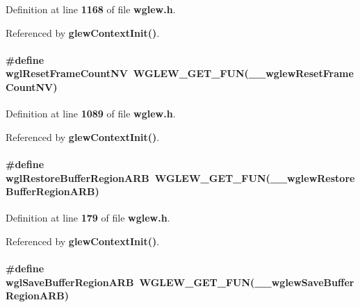 Definition at line {\bf 1168} of file {\bf wglew.\+h}.



Referenced by {\bf glew\+Context\+Init()}.

\paragraph[{wgl\+Reset\+Frame\+Count\+NV}]{\setlength{\rightskip}{0pt plus 5cm}\#define wgl\+Reset\+Frame\+Count\+NV~{\bf W\+G\+L\+E\+W\+\_\+\+G\+E\+T\+\_\+\+F\+UN}({\bf \+\_\+\+\_\+wglew\+Reset\+Frame\+Count\+NV})}\label{wglew_8h_a6d4b87a102ce9b21cc4f91b30b2d119e}


Definition at line {\bf 1089} of file {\bf wglew.\+h}.



Referenced by {\bf glew\+Context\+Init()}.

\paragraph[{wgl\+Restore\+Buffer\+Region\+A\+RB}]{\setlength{\rightskip}{0pt plus 5cm}\#define wgl\+Restore\+Buffer\+Region\+A\+RB~{\bf W\+G\+L\+E\+W\+\_\+\+G\+E\+T\+\_\+\+F\+UN}({\bf \+\_\+\+\_\+wglew\+Restore\+Buffer\+Region\+A\+RB})}\label{wglew_8h_a9f4fdb93cd779a0f8ea1f85426a91636}


Definition at line {\bf 179} of file {\bf wglew.\+h}.



Referenced by {\bf glew\+Context\+Init()}.

\paragraph[{wgl\+Save\+Buffer\+Region\+A\+RB}]{\setlength{\rightskip}{0pt plus 5cm}\#define wgl\+Save\+Buffer\+Region\+A\+RB~{\bf W\+G\+L\+E\+W\+\_\+\+G\+E\+T\+\_\+\+F\+UN}({\bf \+\_\+\+\_\+wglew\+Save\+Buffer\+Region\+A\+RB})}\label{wglew_8h_a47718957769367a4e25f55337886c008}


